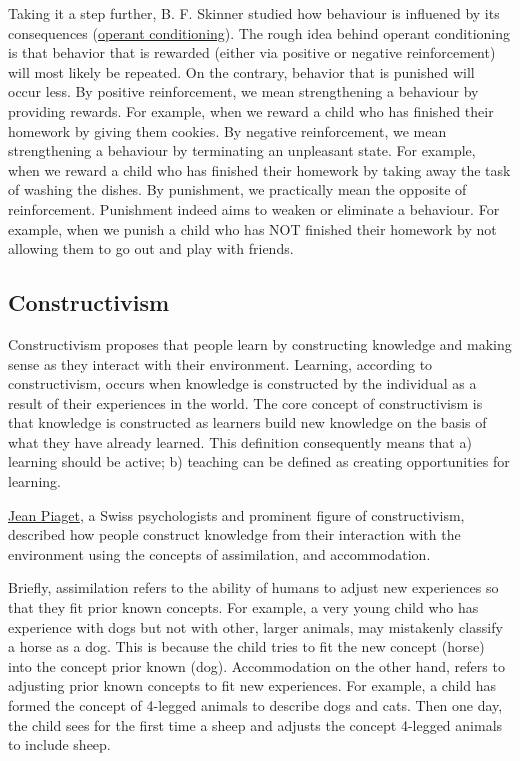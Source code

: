 \documentclass[
]{book}
\begin{document}
Taking it a step further, B. F. Skinner studied how behaviour is influened by its consequences (\href{https://en.wikipedia.org/wiki/Operant_conditioning}{operant conditioning}). The rough idea behind operant conditioning is that behavior that is rewarded (either via positive or negative reinforcement) will most likely be repeated. On the contrary, behavior that is punished will occur less.
By positive reinforcement, we mean strengthening a behaviour by providing rewards. For example, when we reward a child who has finished their homework by giving them cookies.
By negative reinforcement, we mean strengthening a behaviour by terminating an unpleasant state. For example, when we reward a child who has finished their homework by taking away the task of washing the dishes.
By punishment, we practically mean the opposite of reinforcement. Punishment indeed aims to weaken or eliminate a behaviour. For example, when we punish a child who has NOT finished their homework by not allowing them to go out and play with friends.

\subsection{Constructivism}\label{constructivism}

Constructivism proposes that people learn by constructing knowledge and making sense as they interact with their environment. Learning, according to constructivism, occurs when knowledge is constructed by the individual as a result of their experiences in the world. The core concept of constructivism is that knowledge is constructed as learners build new knowledge on the basis of what they have already learned. This definition consequently means that a) learning should be active; b) teaching can be defined as creating opportunities for learning.

\href{https://en.wikipedia.org/wiki/Jean_Piaget}{Jean Piaget}, a Swiss psychologists and prominent figure of constructivism, described how people construct knowledge from their interaction with the environment using the concepts of assimilation, and accommodation.

Briefly, assimilation refers to the ability of humans to adjust new experiences so that they fit prior known concepts. For example, a very young child who has experience with dogs but not with other, larger animals, may mistakenly classify a horse as a dog. This is because the child tries to fit the new concept (horse) into the concept prior known (dog). Accommodation on the other hand, refers to adjusting prior known concepts to fit new experiences. For example, a child has formed the concept of 4-legged animals to describe dogs and cats. Then one day, the child sees for the first time a sheep and adjusts the concept 4-legged animals to include sheep.
\end{document}
